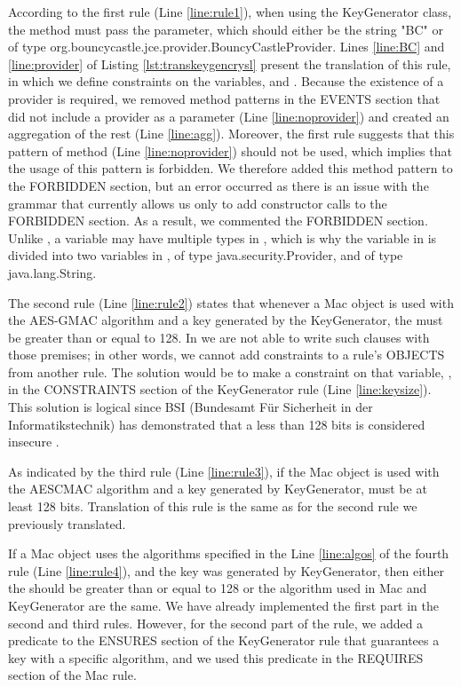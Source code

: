According to the first rule (Line \ref{line:rule1}), when using the KeyGenerator class, the  method must pass the  parameter, which should either be the string "BC" or of type org.bouncycastle.jce.provider.BouncyCastleProvider. Lines \ref{line:BC} and \ref{line:provider} of Listing \ref{lst:transkeygencrysl} present the translation of this rule, in which we define constraints on the variables,  and . Because the existence of a provider is required, we removed  method patterns in the EVENTS section that did not include a provider as a parameter (Line \ref{line:noprovider}) and created an aggregation of the rest (Line \ref{line:agg}). Moreover, the first rule suggests that this pattern of  method (Line \ref{line:noprovider}) should not be used, which implies that the usage of this pattern is forbidden. We therefore added this method pattern to the FORBIDDEN section, but an error occurred as there is an issue with the \crysl{} grammar that currently allows us only to add constructor calls to the FORBIDDEN section. As a result, we commented the FORBIDDEN section.
Unlike \crysl, a variable may have multiple types in \MARK, which is why the variable  in \MARK{} is divided into two variables in \crysl,  of type java.security.Provider, and  of type java.lang.String.

The second rule (Line \ref{line:rule2}) states that whenever a Mac object is used with the AES-GMAC algorithm and a key generated by the KeyGenerator, the  must be greater than or equal to 128. In \crysl{} we are not able to write such clauses with those premises; in other words, we cannot add constraints to a rule's OBJECTS from another rule.
The solution would be to make a constraint on that variable, , in the CONSTRAINTS section of the KeyGenerator \crysl{} rule (Line \ref{line:keysize}). This solution is logical since BSI (Bundesamt Für Sicherheit in der Informatikstechnik) has demonstrated that a  less than 128 bits is considered insecure \cite{BSI}.

As indicated by the third rule (Line \ref{line:rule3}), if the Mac object is used with the AESCMAC algorithm and a key generated by KeyGenerator,  must be at least 128 bits. Translation of this rule is the same as for the second rule we previously translated.

If a Mac object uses the algorithms specified in the Line \ref{line:algos} of the fourth rule (Line \ref{line:rule4}), and the key was generated by KeyGenerator, then either the  should be greater than or equal to 128 or the algorithm used in Mac and KeyGenerator are the same. We have already implemented the first part in the second and third rules. However, for the second part of the rule, we added a predicate to the ENSURES section of the KeyGenerator rule that guarantees a key with a specific algorithm, and we used this predicate in the REQUIRES section of the Mac rule.

